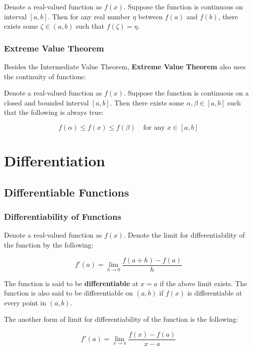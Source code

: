 \documentclass[a4paper,12pt]{article}
\begin{document}
\begin{thm}
  Denote a real-valued function as $f(x)$. Suppose the function is continuous on interval $[a,b]$. Then for any real number $\eta$ between $f(a)$ and $f(b)$, there exists some $\zeta\in (a,b)$ such that $f(\zeta)=\eta$.
\end{thm}

\subsubsection{Extreme Value Theorem}
Besides the Intermediate Value Theorem, \textbf{Extreme Value Theorem} also uses the continuity of functions:\n

\begin{thm}
  Denote a real-valued function as $f(x)$. Suppose the function is continuous on a closed and bounded interval $[a,b]$. Then there exists some $\alpha,\beta\in [a,b]$ such that the following is always true:

  $$f(\alpha)\leq f(x)\leq f(\beta)\;\;\;\;\text{for any }x\in [a,b]$$

\end{thm}

\pagebreak

\section{Differentiation}
\subsection{Differentiable Functions}
\subsubsection{Differentiability of Functions}
\begin{dft}
  Denote a real-valued function as $f(x)$. Denote the limit for differentiability of the function by the following:

  $$f'(a)=\lim_{h\to 0}\frac{f(a+h)-f(a)}{h}$$\s

  The function is said to be \textbf{differentiable} at $x=a$ if the above limit exists. The function is also said to be differentiable on $(a,b)$ if $f(x)$ is differentiable at every point in $(a,b)$.\n

  The another form of limit for differentiability of the function is the following:

  $$f'(a)=\lim_{x\to a}\frac{f(x)-f(a)}{x-a}$$
\end{dft}
\end{document}
